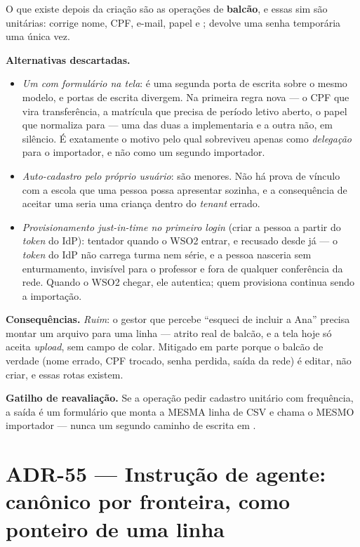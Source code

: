 O que existe depois da criação são as operações de \textbf{balcão}, e essas sim
são unitárias:  corrige nome, CPF, e-mail, papel e
;  devolve uma senha temporária
uma única vez.

\textbf{Alternativas descartadas.}
\begin{itemize}
  \item \emph{Um  com formulário na tela}: é uma segunda
    porta de escrita sobre o mesmo modelo, e portas de escrita divergem. Na
    primeira regra nova --- o CPF que vira transferência, a matrícula que
    precisa de período letivo aberto, o papel  que normaliza
    para  --- uma das duas a implementaria e a outra não, em
    silêncio. É exatamente o motivo pelo qual 
    sobreviveu apenas como \emph{delegação} para o importador, e não como um
    segundo importador.
  \item \emph{Auto-cadastro pelo próprio usuário}: são menores. Não há prova de
    vínculo com a escola que uma pessoa possa apresentar sozinha, e a
    consequência de aceitar uma seria uma criança dentro do \emph{tenant}
    errado.
  \item \emph{Provisionamento \emph{just-in-time} no primeiro login} (criar a
    pessoa a partir do \emph{token} do IdP): tentador quando o WSO2 entrar, e
    recusado desde já --- o \emph{token} do IdP não carrega turma nem série, e a
    pessoa nasceria sem enturmamento, invisível para o professor e fora de
    qualquer conferência da rede. Quando o WSO2 chegar, ele autentica; quem
    provisiona continua sendo a importação.
\end{itemize}

\textbf{Consequências.} \emph{Ruim}: o gestor que percebe \enquote{esqueci de
incluir a Ana} precisa montar um arquivo para uma linha --- atrito real de
balcão, e a tela hoje só aceita \emph{upload}, sem campo de colar. Mitigado em
parte porque o balcão de verdade (nome errado, CPF trocado, senha perdida,
saída da rede) é editar, não criar, e essas rotas existem.

\textbf{Gatilho de reavaliação.} Se a operação pedir cadastro unitário com
frequência, a saída é um formulário que monta a MESMA linha de CSV e chama o
MESMO importador --- nunca um segundo caminho de escrita em .

\section{ADR-55 --- Instrução de agente:  canônico por fronteira,
 como ponteiro de uma linha}
\label{adr:instrucao-de-agente}

